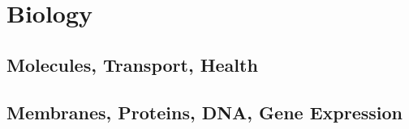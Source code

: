 \chapter{Biology}

\section{Molecules, Transport, Health}




\section{Membranes, Proteins, DNA, Gene Expression}
